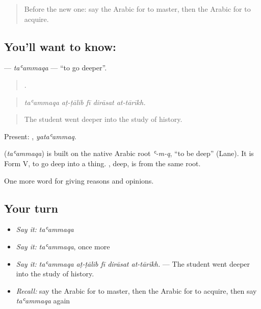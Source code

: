 \label{lesson:AR-C394-taammaqa}



\begin{quote}
Before the new one: say the Arabic for to master, then the Arabic for to acquire.
\end{quote}

\subsection*{You'll want to know: }
\textbf{} — \emph{taʿammaqa} — \textquotedblleft{}to go deeper\textquotedblright{}.

\begin{quote}
    .
\end{quote}

\begin{quote}
\emph{taʿammaqa aṭ-ṭālib fī dirāsat at-tārīkh.}
\end{quote}

\begin{quote}
The student went deeper into the study of history.
\end{quote}

Present: , \emph{yataʿammaq}.

\begin{cousinweb}
\textbf{} (\emph{taʿammaqa}) is built on the native Arabic root \emph{ʿ-m-q}, \textquotedblleft{}to be deep\textquotedblright{} (Lane). It is Form V, to go deep into a thing. , deep, is from the same root.
\end{cousinweb}

\begin{grammarlens}[title={What you've built}]
One more word for giving reasons and opinions.
\end{grammarlens}

\subsection*{Your turn}
\begin{itemize}
\raggedright
  \item \emph{Say it:} \emph{taʿammaqa}
  \item \emph{Say it:} \emph{taʿammaqa}, once more
  \item \emph{Say it:} \emph{taʿammaqa aṭ-ṭālib fī dirāsat at-tārīkh.} — The student went deeper into the study of history.
  \item \emph{Recall:} say the Arabic for to master, then the Arabic for to acquire, then say \emph{taʿammaqa} again
\end{itemize}

